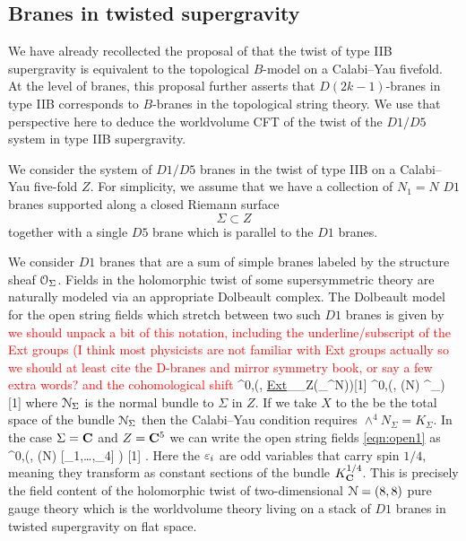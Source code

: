 \documentclass[../main.tex]{subfiles}
\begin{document}
\subsection{Branes in twisted supergravity}

We have already recollected the proposal of \cite{CLsugra} that the twist of type IIB supergravity is equivalent to the topological $B$-model on a Calabi--Yau fivefold.
At the level of branes, this proposal further asserts that $D(2k-1)$-branes in type IIB corresponds to $B$-branes in the topological string theory.
We use that perspective here to deduce the worldvolume CFT of the twist of the $D1/D5$ system in type IIB supergravity.

We consider the system of $D1/D5$ branes in the twist of type IIB on a Calabi--Yau five-fold $Z$. 
For simplicity, we assume that we have a collection of $N_1 = N$ $D1$ branes supported along a closed Riemann surface
\[
\Sigma \subset Z \]
together with a single $D5$ brane which is parallel to the $D1$ branes. 

We consider $D1$ branes that are a sum of simple branes labeled by the structure sheaf $\mathcal O_\Sigma$. Fields in the holomorphic twist of some supersymmetric theory are naturally modeled via an appropriate Dolbeault complex.
The Dolbeault model for the open string fields which stretch between two such $D1$ branes is given by \textcolor{red}{we should unpack a bit of this notation, including the underline/subscript of the Ext groups (I think most physicists are not familiar with Ext groups actually so we should at least cite the D-branes and mirror symmetry book, or say a few extra words? and the cohomological shift} 
\beqn\label{eqn:open1}
\Omega^{0,\bu}(\Sigma, \underline{\rm Ext}_{\cO_Z}(\cO_\Sigma^{\oplus N}))[1] \simeq \Omega^{0,\bu}\left(\Sigma, (N) \otimes \wedge^\bu \cN_\Sigma\right) [1] 
\eeqn
where $\mathcal{N}_\Sigma$ is the normal bundle to $\Sigma$ in $Z$.
If we take $X$ to the be the total space of the bundle $\mathcal{N}_\Sigma$ then the Calabi--Yau condition requires $\wedge^4 N_\Sigma = K_\Sigma$. 
In the case $\Sigma = \mathbf{C}$ and $Z = \mathbf{C}^5$ 
we can write the open string fields \eqref{eqn:open1} as 
\beqn\label{eqn:open1a}
\Omega^{0,\bu}\left(\C , (N) [\ep_1,\ldots,\ep_4] \right) [1] .
\eeqn
Here the $\varepsilon_i$ are odd variables that carry spin $1/4$, meaning they transform as constant sections of the bundle $K_{\mathbf{C}}^{1/4}$.
This is precisely the field content of the holomorphic twist of two-dimensional $\mathcal{N}=(8,8)$ pure gauge theory which is the worldvolume theory living on a stack of $D1$ branes in twisted supergravity on flat space.
\end{document}
